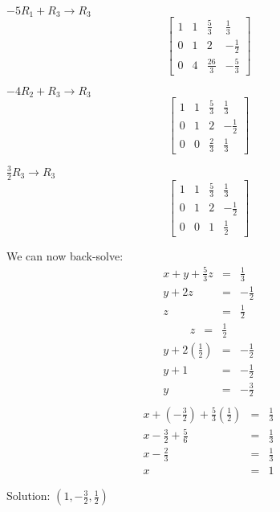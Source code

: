 \documentclass[letterpaper,12pt,fleqn]{article}
\begin{document}
\begin{enumerate}
  $-5R_1+R_3\to R_3$
  \[\left[\begin{array}{ccc|c}
      1 & 1 & \frac{5}{3} & \frac{1}{3} \\
      0 & 1 & 2 & -\frac{1}{2} \\
      0 & 4 & \frac{26}{3} & -\frac{5}{3}
    \end{array}\right]\]

  $-4R_2+R_3\to R_3$
  \[\left[\begin{array}{ccc|c}
      1 & 1 & \frac{5}{3} & \frac{1}{3} \\
      0 & 1 & 2 & -\frac{1}{2} \\
      0 & 0 & \frac{2}{3} & \frac{1}{3}
    \end{array}\right]\]

  $\frac{3}{2}R_3\to R_3$
  \[\left[\begin{array}{ccc|c}
      1 & 1 & \frac{5}{3} & \frac{1}{3} \\
      0 & 1 & 2 & -\frac{1}{2} \\
      0 & 0 & 1 & \frac{1}{2}
    \end{array}\right]\]

  We can now back-solve:
  \begin{eqnarray*}
    x+y+\frac{5}{3}z &=& \frac{1}{3} \\
    y+2z &=& -\frac{1}{2} \\
    z &=& \frac{1}{2}
  \end{eqnarray*}
  \begin{eqnarray*}
    z &=& \frac{1}{2}
  \end{eqnarray*}
  \begin{eqnarray*}
    y+2(\frac{1}{2}) &=& -\frac{1}{2} \\
    y+1 &=& -\frac{1}{2} \\
    y &=& -\frac{3}{2} \\
  \end{eqnarray*}
  \begin{eqnarray*}
    x+(-\frac{3}{2})+\frac{5}{3}(\frac{1}{2}) &=& \frac{1}{3} \\
    x-\frac{3}{2}+\frac{5}{6} &=& \frac{1}{3} \\
    x-\frac{2}{3} &=& \frac{1}{3} \\
    x &=& 1
  \end{eqnarray*}

  Solution: $\left(1,-\frac{3}{2},\frac{1}{2}\right)$
\end{enumerate}
\end{document}
